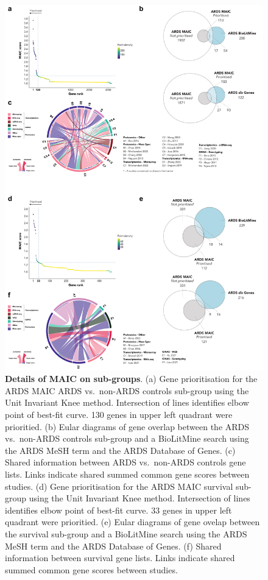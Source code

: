 \documentclass[
  11,
  a4paper,
]{article}
\begin{document}
\begin{figure}[H]

{\centering \includegraphics{../img/Supplementary_Figure_7.png}

}

\caption{\textbf{Details of MAIC on sub-groups}. (a) Gene prioritisation
for the ARDS MAIC ARDS vs.~non-ARDS controls sub-group using the Unit
Invariant Knee method. Intersection of lines identifies elbow point of
best-fit curve. 130 genes in upper left quadrant were prioritied. (b)
Eular diagrams of gene overlap between the ARDS vs.~non-ARDS controls
sub-group and a BioLitMine search using the ARDS MeSH term and the ARDS
Database of Genes. (c) Shared information between ARDS vs.~non-ARDS
controls gene lists. Links indicate shared summed common gene scores
between studies. (d) Gene prioritisation for the ARDS MAIC survival
sub-group using the Unit Invariant Knee method. Intersection of lines
identifies elbow point of best-fit curve. 33 genes in upper left
quadrant were prioritied. (e) Eular diagrams of gene ovelap between the
survival sub-group and a BioLitMine search using the ARDS MeSH term and
the ARDS Database of Genes. (f) Shared information between survival gene
lists. Links indicate shared summed common gene scores between studies.}

\end{figure}%
\end{document}
